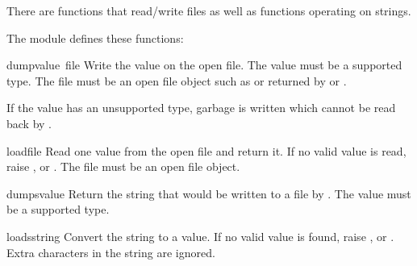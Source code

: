 There are functions that read/write files as well as functions
operating on strings.

The module defines these functions:

\renewcommand{\indexsubitem}{(in module marshal)}

\begin{funcdesc}{dump}{value\, file}
  Write the value on the open file.  The value must be a supported
  type.  The file must be an open file object such as
   or returned by  or
  .
  
  If the value has an unsupported type, garbage is written which cannot
  be read back by .
\end{funcdesc}

\begin{funcdesc}{load}{file}
  Read one value from the open file and return it.  If no valid value
  is read, raise ,  or
  .  The file must be an open file object.
\end{funcdesc}

\begin{funcdesc}{dumps}{value}
  Return the string that would be written to a file by
  .  The value must be a supported type.
\end{funcdesc}

\begin{funcdesc}{loads}{string}
  Convert the string to a value.  If no valid value is found, raise
  ,  or .  Extra
  characters in the string are ignored.
\end{funcdesc}
